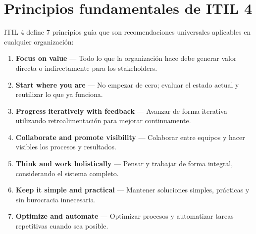 \documentclass{article}
\begin{document}
\section{Principios fundamentales de ITIL 4}

ITIL 4 define 7 principios guía que son recomendaciones universales aplicables en cualquier organización:

\begin{enumerate}[label=\textbf{\arabic*.}]
    \item \textbf{Focus on value} --- Todo lo que la organización hace debe generar valor directa o indirectamente para los stakeholders.
    \item \textbf{Start where you are} --- No empezar de cero; evaluar el estado actual y reutilizar lo que ya funciona.
    \item \textbf{Progress iteratively with feedback} --- Avanzar de forma iterativa utilizando retroalimentación para mejorar continuamente.
    \item \textbf{Collaborate and promote visibility} --- Colaborar entre equipos y hacer visibles los procesos y resultados.
    \item \textbf{Think and work holistically} --- Pensar y trabajar de forma integral, considerando el sistema completo.
    \item \textbf{Keep it simple and practical} --- Mantener soluciones simples, prácticas y sin burocracia innecesaria.
    \item \textbf{Optimize and automate} --- Optimizar procesos y automatizar tareas repetitivas cuando sea posible.
\end{enumerate}
\end{document}
